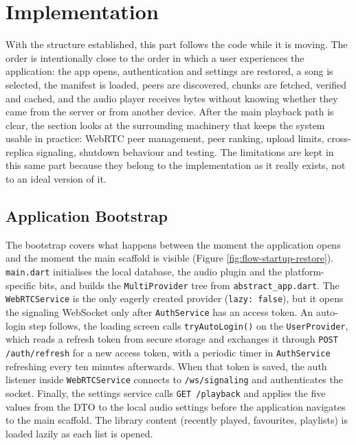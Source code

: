 \section{Implementation}
\label{sec:implementation}

\indent \par With the structure established, this part follows the code while it is moving. The order is intentionally close to the order in which a user experiences the application: the app opens, authentication and settings are restored, a song is selected, the manifest is loaded, peers are discovered, chunks are fetched, verified and cached, and the audio player receives bytes without knowing whether they came from the server or from another device. After the main playback path is clear, the section looks at the surrounding machinery that keeps the system usable in practice: WebRTC peer management, peer ranking, upload limits, cross-replica signaling, shutdown behaviour and testing. The limitations are kept in this same part because they belong to the implementation as it really exists, not to an ideal version of it.

\subsection{Application Bootstrap}
\label{sec:bootstrap}

\indent \par The bootstrap covers what happens between the moment the application opens and the moment the main scaffold is visible (Figure \ref{fig:flow-startup-restore}). \texttt{main.dart} initialises the local database, the audio plugin and the platform-specific bits, and builds the \texttt{MultiProvider} tree from \texttt{abstract\_app.dart}. The \texttt{WebRTCService} is the only eagerly created provider (\texttt{lazy: false}), but it opens the signaling WebSocket only after \texttt{AuthService} has an access token. An auto-login step follows, the loading screen calls \texttt{tryAutoLogin()} on the \texttt{UserProvider}, which reads a refresh token from secure storage and exchanges it through \texttt{POST /auth/refresh} for a new access token, with a periodic timer in \texttt{AuthService} refreshing every ten minutes afterwards. When that token is saved, the auth listener inside \texttt{WebRTCService} connects to \texttt{/ws/signaling} and authenticates the socket. Finally, the settings service calls \texttt{GET /playback} and applies the five values from the DTO to the local audio settings before the application navigates to the main scaffold. The library content (recently played, favourites, playlists) is loaded lazily as each list is opened.

